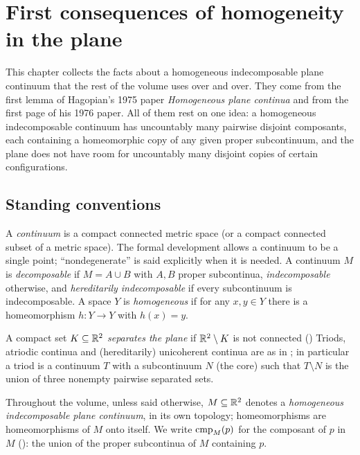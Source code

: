 \chapter{First consequences of homogeneity in the plane}\label{ch:homog}

This chapter collects the facts about a homogeneous indecomposable plane continuum that the rest of
the volume uses over and over. They come from the first lemma of Hagopian's 1975 paper
\emph{Homogeneous plane continua} and from the first page of his 1976 paper. All of them rest on one
idea: a homogeneous indecomposable continuum has uncountably many pairwise disjoint composants, each
containing a homeomorphic copy of any given proper subcontinuum, and the plane does not have room for
uncountably many disjoint copies of certain configurations.

\section{Standing conventions}

A \emph{continuum} is a compact connected metric space (or a compact connected subset of a metric
space). The formal development allows a continuum to be a single point; ``nondegenerate'' is said
explicitly when it is needed. A continuum $M$ is \emph{decomposable} if $M=A\cup B$ with $A,B$ proper
subcontinua, \emph{indecomposable} otherwise, and \emph{hereditarily indecomposable} if every
subcontinuum is indecomposable. A space $Y$ is \emph{homogeneous} if for any $x,y\in Y$ there is a
homeomorphism $h\colon Y\to Y$ with $h(x)=y$.


A compact set $K\subseteq\mathbb{R}^2$ \emph{separates the plane} if $\mathbb{R}^2\setminus K$ is not connected
() Triods, atriodic continua and (hereditarily) unicoherent
continua are as in ; in particular a triod is a continuum $T$ with a
subcontinuum $N$ (the core) such that $T\setminus N$ is the union of three nonempty pairwise separated
sets.

Throughout the volume, unless said otherwise, $M\subseteq\mathbb{R}^2$ denotes a \emph{homogeneous
indecomposable plane continuum}, in its own topology; homeomorphisms are homeomorphisms of $M$ onto
itself. We write $\operatorname{cmp}_{M}(p)$ for the composant of $p$ in $M$ (): the union of the
proper subcontinua of $M$ containing $p$.

